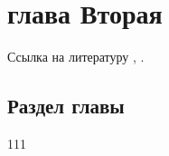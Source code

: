 \chapter{глава Вторая} \label{sec: Chapter-2}
Ссылка на литературу \cite{Sobolev:application-FA-MathPhys}, \cite{Kolmogorov-Fomin:Elements-FA}.

\section{Раздел главы} \label{sec: some-name}
111
\newpage